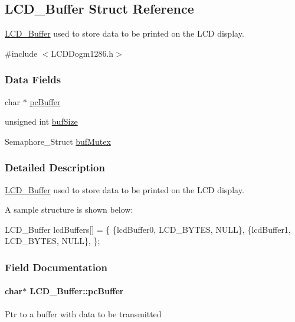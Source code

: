\subsection{L\+C\+D\+\_\+\+Buffer Struct Reference}
\label{struct_l_c_d___buffer}


\hyperlink{struct_l_c_d___buffer}{L\+C\+D\+\_\+\+Buffer} used to store data to be printed on the L\+C\+D display.  




{\ttfamily \#include $<$L\+C\+D\+Dogm1286.\+h$>$}

\subsubsection*{Data Fields}
\begin{DoxyCompactItemize}
\item 
char $\ast$ \hyperlink{struct_l_c_d___buffer_af0f290cdf7fc2b94ebe0a918cc736982}{pc\+Buffer}
\item 
unsigned int \hyperlink{struct_l_c_d___buffer_a77c4adb59142a732371a552558161ebf}{buf\+Size}
\item 
Semaphore\+\_\+\+Struct \hyperlink{struct_l_c_d___buffer_a48816704d8fb2c059d0c4c2ce3234cd7}{buf\+Mutex}
\end{DoxyCompactItemize}


\subsubsection{Detailed Description}
\hyperlink{struct_l_c_d___buffer}{L\+C\+D\+\_\+\+Buffer} used to store data to be printed on the L\+C\+D display. 

A sample structure is shown below\+: 
\begin{DoxyCode}
LCD_Buffer lcdBuffers[] = \{
    \{lcdBuffer0, LCD_BYTES, NULL\},
    \{lcdBuffer1, LCD_BYTES, NULL\},
\};
\end{DoxyCode}
 

\subsubsection{Field Documentation}
\paragraph[{pc\+Buffer}]{\setlength{\rightskip}{0pt plus 5cm}char$\ast$ L\+C\+D\+\_\+\+Buffer\+::pc\+Buffer}\label{struct_l_c_d___buffer_af0f290cdf7fc2b94ebe0a918cc736982}
Ptr to a buffer with data to be transmitted 
